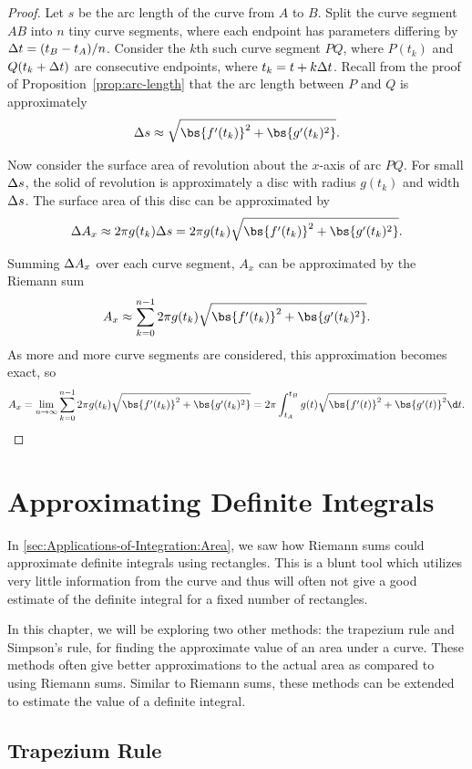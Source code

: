 \begin{proof}
    Let $s$ be the arc length of the curve from $A$ to $B$. Split the curve segment $AB$ into $n$ tiny curve segments, where each endpoint has parameters differing by $\Delta t = (t_B - t_A)/n$. Consider the $k$th such curve segment $PQ$, where $P(t_k)$ and $Q(t_k + \Delta t)$ are consecutive endpoints, where $t_k = t + k \Delta t$. Recall from the proof of Proposition~\ref{prop:arc-length} that the arc length between $P$ and $Q$ is approximately \[\D s \approx \sqrt{\bs{f'(t_k)}^2 + \bs{g'(t_k)^2}}.\]

    Now consider the surface area of revolution about the $x$-axis of arc $PQ$. For small $\Delta s$, the solid of revolution is approximately a disc with radius $g(t_k)$ and width $\Delta s$. The surface area of this disc can be approximated by \[\D A_x \approx 2 \pi g(t_k) \D s = 2 \pi g(t_k) \sqrt{\bs{f'(t_k)}^2 + \bs{g'(t_k)^2}}.\]

    Summing $\Delta A_x$ over each curve segment, $A_x$ can be approximated by the Riemann sum \[A_x \approx \sum_{k = 0}^{n-1} 2 \pi g(t_k) \sqrt{\bs{f'(t_k)}^2 + \bs{g'(t_k)^2}}.\] As more and more curve segments are considered, this approximation becomes exact, so \[A_x = \lim_{n \to \infty} \sum_{k = 0}^{n-1} 2 \pi g(t_k) \sqrt{\bs{f'(t_k)}^2 + \bs{g'(t_k)^2}} = 2\pi \int_{t_A}^{t_B} g(t) \sqrt{\bs{f'(t)}^2 + \bs{g'(t)}^2} \d t.\]
\end{proof}

\section{Approximating Definite Integrals}

In \SS\ref{sec:Applications-of-Integration:Area}, we saw how Riemann sums could approximate definite integrals using rectangles. This is a blunt tool which utilizes very little information from the curve and thus will often not give a good estimate of the definite integral for a fixed number of rectangles.

In this chapter, we will be exploring two other methods: the trapezium rule and Simpson's rule, for finding the approximate value of an area under a curve. These methods often give better approximations to the actual area as compared to using Riemann sums. Similar to Riemann sums, these methods can be extended to estimate the value of a definite integral.

\subsection{Trapezium Rule}

